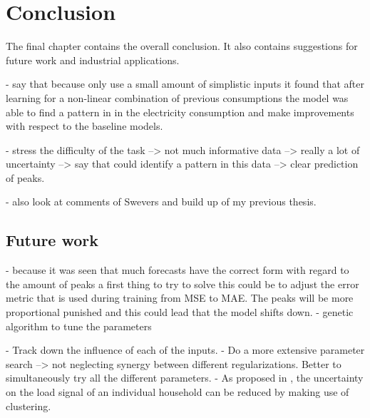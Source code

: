 \chapter{Conclusion}
\label{cha:conclusion}
The final chapter contains the overall conclusion. It also contains
suggestions for future work and industrial applications.

- say that because only use a small amount of simplistic inputs it found that after learning for a non-linear combination of previous consumptions the model was able to find a pattern in in the electricity consumption and make improvements with respect to the baseline models.

- stress the difficulty of the task --> not much informative data --> really a lot of uncertainty --> say that could identify a pattern in this data --> clear prediction of peaks.

- also look at comments of Swevers and build up of my previous thesis.

\section{Future work}
- because it was seen that much forecasts have the correct form with regard to the amount of peaks a first thing to try to solve this could be to adjust the error metric that is used during training from MSE to MAE. The peaks will be more proportional punished and this could lead that the model shifts down. 
- genetic algorithm to tune the parameters

- Track down the influence of each of the inputs.
- Do a more extensive parameter search --> not neglecting synergy between different regularizations. Better to simultaneously try all the different parameters.
- As proposed in \cite{Shi2018}, the uncertainty on the load signal of an individual household can be reduced by making use of clustering. 

